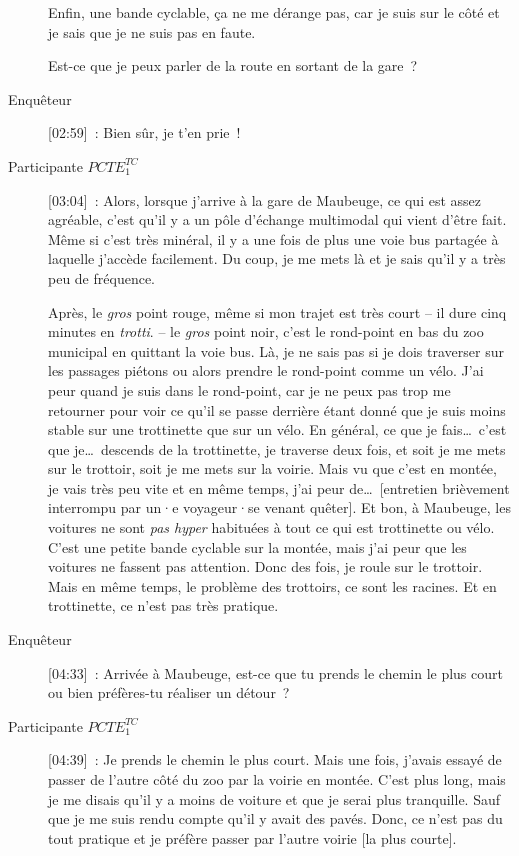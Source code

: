 \begin{description}
    Enfin, une bande cyclable, ça ne me dérange pas, car je suis sur le côté et je sais que je ne suis pas en faute.%
    
    Est-ce que je peux parler de la route en sortant de la gare~?
    \item[Enquêteur] [02:59]~: Bien sûr, je t'en prie~!
    \item[Participante \(PCTE^{TC}_{1}\)] [03:04]~: Alors, lorsque j’arrive à la gare de Maubeuge, ce qui est assez agréable, c’est qu’il y a un pôle d’échange multimodal qui vient d’être fait. Même si c’est très minéral, il y a une fois de plus une voie bus partagée à laquelle j’accède facilement. Du coup, je me mets là et je sais qu’il y a très peu de fréquence.%
    
    Après, le \textsl{gros} point rouge, même si mon trajet est très court – il dure cinq minutes en \textsl{trotti}. – le \textsl{gros} point noir, c’est le rond-point en bas du zoo municipal en quittant la voie bus. Là, je ne sais pas si je dois traverser sur les passages piétons ou alors prendre le rond-point comme un vélo. J’ai peur quand je suis dans le rond-point, car je ne peux pas trop me retourner pour voir ce qu’il se passe derrière étant donné que je suis moins stable sur une trottinette que sur un vélo. En général, ce que je fais\dots~c’est que je\dots~descends de la trottinette, je traverse deux fois, et soit je me mets sur le trottoir, soit je me mets sur la voirie. Mais vu que c’est en montée, je vais très peu vite et en même temps, j’ai peur de\dots~[entretien brièvement interrompu par un·e voyageur·se venant quêter]. Et bon, à Maubeuge, les voitures ne sont \textsl{pas hyper} habituées à tout ce qui est trottinette ou vélo. C’est une petite bande cyclable sur la montée, mais j’ai peur que les voitures ne fassent pas attention. Donc des fois, je roule sur le trottoir. Mais en même temps, le problème des trottoirs, ce sont les racines. Et en trottinette, ce n’est pas très pratique.
    \item[Enquêteur] [04:33]~: Arrivée à Maubeuge, est-ce que tu prends le chemin le plus court ou bien préfères-tu réaliser un détour~?
    \item[Participante \(PCTE^{TC}_{1}\)] [04:39]~: Je prends le chemin le plus court. Mais une fois, j’avais essayé de passer de l’autre côté du zoo par la voirie en montée. C’est plus long, mais je me disais qu’il y a moins de voiture et que je serai plus tranquille. Sauf que je me suis rendu compte qu’il y avait des pavés. Donc, ce n’est pas du tout pratique et je préfère passer par l’autre voirie [la plus courte].

\end{description}

